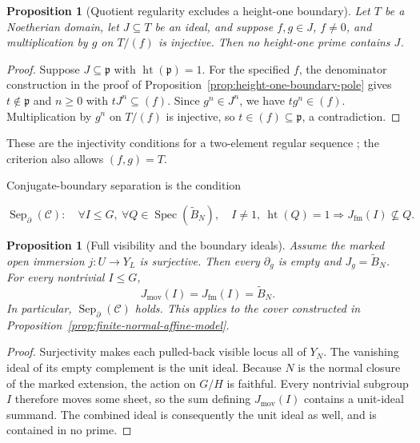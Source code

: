 \documentclass[11pt]{article}
\newtheorem{proposition}[theorem]{Proposition}
\theoremstyle{definition}
\theoremstyle{remark}
\DeclareMathOperator{\Spec}{Spec}
\begin{document}
\begin{proposition}[Quotient regularity excludes a height-one boundary]
\label{prop:regular-pair-boundary}
Let \(T\) be a Noetherian domain, let \(J\subseteq T\) be an ideal,
and suppose \(f,g\in J\), \(f\ne0\), and multiplication by \(g\)
on \(T/(f)\) is injective. Then no height-one prime contains \(J\).
\end{proposition}

\begin{proof}
Suppose \(J\subseteq\mathfrak p\) with
\(\operatorname{ht}(\mathfrak p)=1\). For the specified \(f\), the
denominator construction in the proof of
Proposition~\ref{prop:height-one-boundary-pole} gives
\(t\notin\mathfrak p\) and \(n\ge0\) with \(tJ^n\subseteq(f)\).
Since \(g^n\in J^n\), we have \(tg^n\in(f)\). Multiplication by
\(g^n\) on \(T/(f)\) is injective, so \(t\in(f)\subseteq\mathfrak p\),
a contradiction.
\end{proof}

These are the injectivity conditions for a two-element regular sequence
\cite{StacksRegularSequenceDefinition}; the criterion also allows
\((f,g)=T\).

Conjugate-boundary separation is the condition

\[
  \operatorname{Sep}_{\partial}(\mathcal C):
  \quad \forall I\leq G,\ \forall Q\in\Spec(\widetilde B_N),\quad
  I\neq1,\ \operatorname{ht}(Q)=1
  \Longrightarrow J_{\mathrm{fm}}(I)\nsubseteq Q.
\]

\begin{proposition}[Full visibility and the boundary ideals]
\label{prop:full-visible-boundary}
Assume the marked open immersion
\(j:U\to Y_L\) is surjective. Then every \(\partial_g\) is empty
and \(J_g=\widetilde B_N\). For every nontrivial \(I\leq G\),
\[
  J_{\mathrm{mov}}(I)=J_{\mathrm{fm}}(I)=\widetilde B_N.
\]
In particular, \(\operatorname{Sep}_{\partial}(\mathcal C)\) holds.
This applies to the cover constructed in
Proposition~\ref{prop:finite-normal-affine-model}.
\end{proposition}

\begin{proof}
Surjectivity makes each pulled-back visible locus all of \(Y_N\).
The vanishing ideal of its empty complement is the unit ideal.
Because \(N\) is the normal closure of the marked extension, the
action on \(G/H\) is faithful. Every nontrivial subgroup \(I\)
therefore moves some sheet, so the sum defining \(J_{\mathrm{mov}}(I)\)
contains a unit-ideal summand. The combined ideal is consequently the
unit ideal as well, and is contained in no prime.
\end{proof}
\end{document}
